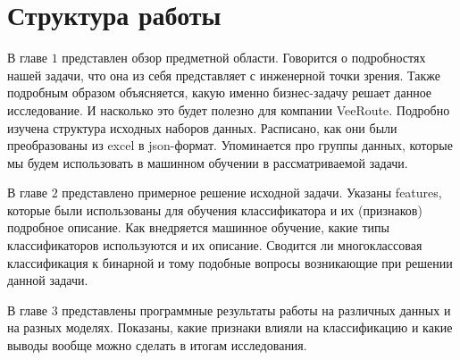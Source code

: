 \section{Структура работы}

В главе $1$ представлен обзор предметной области.
Говорится о подробностях нашей задачи, что она из себя представляет с инженерной точки зрения.
Также подробным образом объясняется, какую именно бизнес-задачу решает данное исследование.
И насколько это будет полезно для компании VeeRoute.
Подробно изучена структура исходных наборов данных.
Расписано, как они были преобразованы из excel в json-формат.
Упоминается про группы данных, которые мы будем использовать в машинном обучении в рассматриваемой задачи.

В главе $2$ представлено примерное решение исходной задачи.
Указаны features, которые были использованы для обучения классификатора и их (признаков) подробное описание.
Как внедряется машинное обучение, какие типы классификаторов используются и их описание. Сводится ли многоклассовая классификация к бинарной и тому подобные вопросы возникающие при решении данной задачи.

В главе $3$ представлены программные результаты работы на различных данных и на разных моделях.
Показаны, какие признаки влияли на классификацию и какие выводы вообще можно сделать в итогам исследования.

